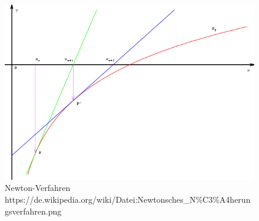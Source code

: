 \documentclass[a4paper,12pt]{llncs}
\numberwithin{equation}{section}
\begin{document}
\begin{figure}[ht]   
	\centering
	\includegraphics[width=.5\linewidth]{figures/newton}
	\caption{Newton-Verfahren\\\tiny{https://de.wikipedia.org/wiki/Datei:Newtonsches\_N\%C3\%A4herungsverfahren.png}}
	\label{fig:newton}
\end{figure}
\end{document}
